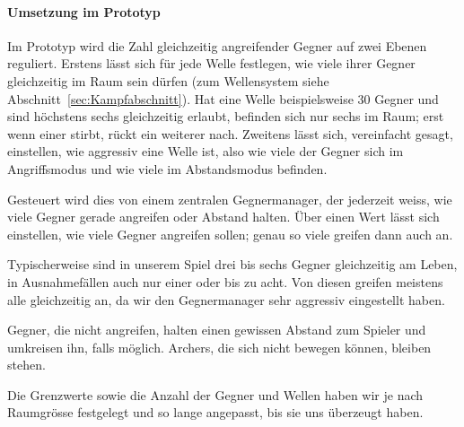 \documentclass[../Main.tex]{subfiles}
\begin{document}
\paragraph{Umsetzung im Prototyp}
Im Prototyp wird die Zahl gleichzeitig angreifender Gegner auf zwei Ebenen reguliert. Erstens lässt sich für jede Welle festlegen, wie viele ihrer Gegner gleichzeitig im Raum sein dürfen (zum Wellensystem siehe Abschnitt~\ref{sec:Kampfabschnitt}). Hat eine Welle beispielsweise 30 Gegner und sind höchstens sechs gleichzeitig erlaubt, befinden sich nur sechs im Raum; erst wenn einer stirbt, rückt ein weiterer nach. Zweitens lässt sich, vereinfacht gesagt, einstellen, wie aggressiv eine Welle ist, also wie viele der Gegner sich im Angriffsmodus und wie viele im Abstandsmodus befinden.

Gesteuert wird dies von einem zentralen Gegnermanager, der jederzeit weiss, wie viele Gegner gerade angreifen oder Abstand halten. Über einen Wert lässt sich einstellen, wie viele Gegner angreifen sollen; genau so viele greifen dann auch an.

Typischerweise sind in unserem Spiel drei bis sechs Gegner gleichzeitig am Leben, in Ausnahmefällen auch nur einer oder bis zu acht. Von diesen greifen meistens alle gleichzeitig an, da wir den Gegnermanager sehr aggressiv eingestellt haben.

Gegner, die nicht angreifen, halten einen gewissen Abstand zum Spieler und umkreisen ihn, falls möglich. Archers, die sich nicht bewegen können, bleiben stehen.

Die Grenzwerte sowie die Anzahl der Gegner und Wellen haben wir je nach Raumgrösse festgelegt und so lange angepasst, bis sie uns überzeugt haben.
\end{document}
